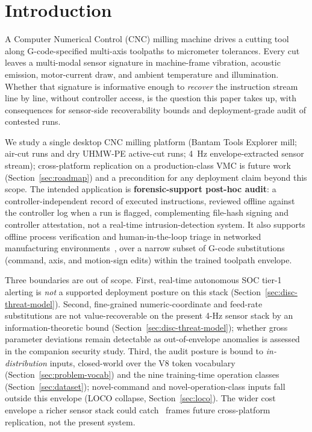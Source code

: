 \documentclass[sensors,article,submit,moreauthors,pdftex]{Definitions/mdpi}
\begin{document}
\section{Introduction}
\label{sec:introduction}

A Computer Numerical Control (CNC) milling machine drives a cutting tool along G-code-specified multi-axis toolpaths to micrometer tolerances. Every cut leaves a multi-modal sensor signature in machine-frame vibration, acoustic emission, motor-current draw, and ambient temperature and illumination. Whether that signature is informative enough to \emph{recover} the instruction stream line by line, without controller access, is the question this paper takes up, with consequences for sensor-side recoverability bounds and deployment-grade audit of contested runs.

We study a single desktop CNC milling platform (Bantam Tools Explorer mill; air-cut runs and dry UHMW-PE active-cut runs; 4~Hz envelope-extracted sensor stream); cross-platform replication on a production-class VMC is future work (Section~\ref{sec:roadmap}) and a precondition for any deployment claim beyond this scope. The intended application is \textbf{forensic-support post-hoc audit}: a controller-independent record of executed instructions, reviewed offline against the controller log when a run is flagged, complementing file-hash signing and controller attestation, not a real-time intrusion-detection system. It also supports offline process verification and human-in-the-loop triage in networked manufacturing environments~\cite{nist2023sp80082,nist2024fmnet,sturm2014cyber,yampolskiy2018security,zhong2017intelligent,kimmell2025cnc}, over a narrow subset of G-code substitutions (command, axis, and motion-sign edits) within the trained toolpath envelope.

Three boundaries are out of scope. First, real-time autonomous SOC tier-1 alerting is \emph{not} a supported deployment posture on this stack (Section~\ref{sec:disc-threat-model}). Second, fine-grained numeric-coordinate and feed-rate substitutions are not value-recoverable on the present 4-Hz sensor stack by an information-theoretic bound (Section~\ref{sec:disc-threat-model}); whether gross parameter deviations remain detectable as out-of-envelope anomalies is assessed in the companion security study. Third, the audit posture is bound to \emph{in-distribution} inputs, closed-world over the V8 token vocabulary (Section~\ref{sec:problem-vocab}) and the nine training-time operation classes (Section~\ref{sec:dataset}); novel-command and novel-operation-class inputs fall outside this envelope (LOCO collapse, Section~\ref{sec:loco}). The wider cost envelope a richer sensor stack could catch~\cite{teti2010advanced,serin2020tool} frames future cross-platform replication, not the present system.
\end{document}
